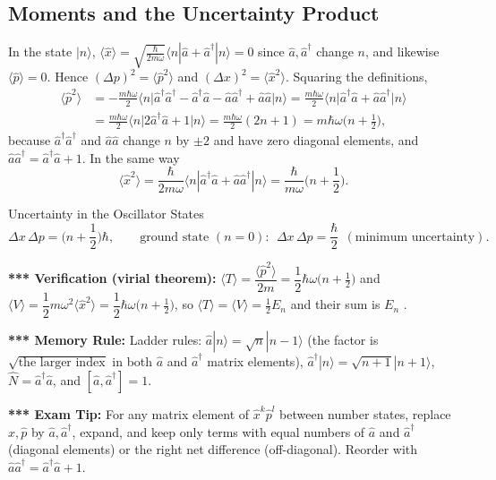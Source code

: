 \documentclass[11pt,a4paper]{article}
\begin{document}
\subsection{Moments and the Uncertainty Product}
In the state $|n\rangle$, $\langle\hat x\rangle=\sqrt{\frac\hbar{2m\omega}}\langle n|\hat a+\hat a^\dagger|n\rangle=0$ since $\hat a,\hat a^\dagger$ change $n$, and likewise $\langle\hat p\rangle=0$. Hence $(\Delta p)^2=\langle\hat p^2\rangle$ and $(\Delta x)^2=\langle\hat x^2\rangle$. Squaring the definitions,
\begin{align*}
\langle\hat p^2\rangle&=-\frac{m\hbar\omega}2\big\langle n\big|\hat a^\dagger\hat a^\dagger-\hat a^\dagger\hat a-\hat a\hat a^\dagger+\hat a\hat a\big|n\big\rangle
=\frac{m\hbar\omega}2\big\langle n\big|\hat a^\dagger\hat a+\hat a\hat a^\dagger\big|n\big\rangle\\
&=\frac{m\hbar\omega}2\big\langle n\big|2\hat a^\dagger\hat a+1\big|n\big\rangle=\frac{m\hbar\omega}2(2n+1)=m\hbar\omega\Big(n+\frac12\Big),
\end{align*}
because $\hat a^\dagger\hat a^\dagger$ and $\hat a\hat a$ change $n$ by $\pm2$ and have zero diagonal elements, and $\hat a\hat a^\dagger=\hat a^\dagger\hat a+1$. In the same way
\[
\langle\hat x^2\rangle=\frac\hbar{2m\omega}\langle n|\hat a^\dagger\hat a+\hat a\hat a^\dagger|n\rangle=\frac\hbar{m\omega}\Big(n+\frac12\Big).
\]
\begin{thm}{Uncertainty in the Oscillator States}
\[
\Delta x\,\Delta p=\Big(n+\frac12\Big)\hbar,\qquad\text{ground state }(n=0):\ \ \Delta x\,\Delta p=\frac\hbar2\ \ (\text{minimum uncertainty}).
\]
\end{thm}
\textbf{*** Verification (virial theorem):} $\langle T\rangle=\dfrac{\langle\hat p^2\rangle}{2m}=\dfrac12\hbar\omega\big(n+\frac12\big)$ and $\langle V\rangle=\dfrac12m\omega^2\langle\hat x^2\rangle=\dfrac12\hbar\omega\big(n+\frac12\big)$, so $\langle T\rangle=\langle V\rangle=\frac12E_n$ and their sum is $E_n$ \checkmark.

\textbf{*** Memory Rule:} Ladder rules: $\hat a|n\rangle=\sqrt n|n-1\rangle$ (the factor is $\sqrt{\text{the larger index}}$ in both $\hat a$ and $\hat a^\dagger$ matrix elements), $\hat a^\dagger|n\rangle=\sqrt{n+1}|n+1\rangle$, $\hat N=\hat a^\dagger\hat a$, and $[\hat a,\hat a^\dagger]=1$.

\textbf{*** Exam Tip:} For any matrix element of $\hat x^k\hat p^l$ between number states, replace $\hat x,\hat p$ by $\hat a,\hat a^\dagger$, expand, and keep only terms with equal numbers of $\hat a$ and $\hat a^\dagger$ (diagonal elements) or the right net difference (off-diagonal). Reorder with $\hat a\hat a^\dagger=\hat a^\dagger\hat a+1$.
\end{document}

